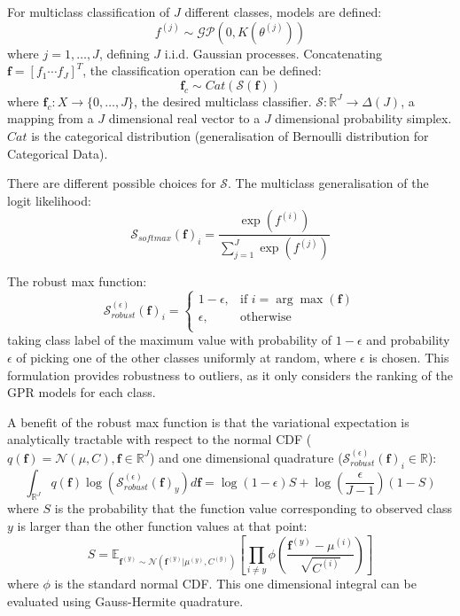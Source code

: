 \documentclass[twoside,11pt]{article}
\begin{document}
For multiclass classification of $J$ different classes, models are defined:
\[f^{(j)} \sim \mathcal{GP}(0, K(\theta^{(j)}))\]
where $j=1, \dots, J$, defining $J$ i.i.d. Gaussian processes.
Concatenating $\mathbf{f} = [f_1 \cdots f_J]^T$, the classification operation can be defined:
\[\mathbf{f}_c \sim Cat (\mathcal{S}(\mathbf{f}))\]
where $\mathbf{f}_c: X \rightarrow \{0, \dots, J\}$, the desired multiclass classifier. $\mathcal{S}: \mathbb{R}^J \rightarrow \Delta(J)$, a mapping from a $J$ dimensional real vector to a $J$ dimensional probability simplex. $Cat$ is the categorical distribution (generalisation of Bernoulli distribution for Categorical Data).

There are different possible choices for $\mathcal{S}$.
The multiclass generalisation of the logit likelihood:
\[\mathcal{S}_{softmax}(\mathbf{f})_i = \frac{\exp(f^{(i)})}{\sum_{j=1}^{J} \exp(f^{(j)})}\]

The robust max function:
\[\mathcal{S}_{robust}^{(\epsilon)}(\mathbf{f})_i = \begin{cases}
      1-\epsilon, &  \text{if } i = \arg \max(\mathbf{f}) \\
      \epsilon, & \text{otherwise} \\
   \end{cases}\]
taking class label of the maximum value with probability of $1-\epsilon$ and probability $\epsilon$ of picking one of the other classes uniformly at random, where $\epsilon$ is chosen.
This formulation provides robustness to outliers, as it only considers the ranking of the GPR models for each class.

A benefit of the robust max function is that the variational expectation is analytically tractable with respect to the normal CDF ($q(\mathbf{f}) = \mathcal{N}(\mu, C), \mathbf{f} \in \mathbb{R}^J$) and one dimensional quadrature ($\mathcal{S}_{robust}^{(\epsilon)}(\mathbf{f})_i \in \mathbb{R}$):
\[\int_{\mathbb{R}^J} q(\mathbf{f}) \log(\mathcal{S}_{robust}^{(\epsilon)}(\mathbf{f})_y) d\textbf{f} = \log(1-\epsilon) S + \log\left(\frac{\epsilon}{J-1}\right)(1-S)\]
where $S$ is the probability that the function value corresponding to observed class $y$ is larger than the other function values at that point:
\[S = \mathbb{E}_{\mathbf{f}^{(y)} \sim \mathcal{N}(\mathbf{f}^{(y)} | \mu^{(y)}, C^{(y)})} \left[\prod_{i \neq y} \phi \left(\frac{\textbf{f}^{(y)}-\mu^{(i)}}{\sqrt{C^{(i)}}} \right)\right]\]
where $\phi$ is the standard normal CDF. This one dimensional integral can be evaluated using Gauss-Hermite quadrature.
\end{document}
